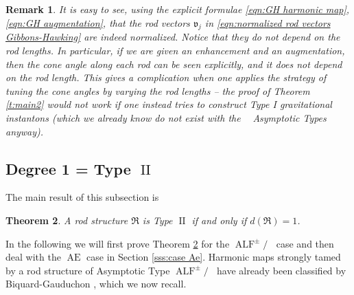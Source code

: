 \documentclass[a4paper,11pt]{amsart}
\newtheorem{theorem}{Theorem}[section]
\newtheorem{remark}[theorem]{Remark}
\theoremstyle{definition}
\numberwithin{equation}{section}
\newcommand{\mv} {\mathfrak v}
\newcommand{\mR} {\mathfrak R}
\DeclareMathOperator{\II}{II}
\DeclareMathOperator{\Ae}{AE}
\DeclareMathOperator{\ALF}{ALF}
\DeclareMathOperator{\AFa}{AF_\beta}
\begin{document}
\begin{remark}\label{rem:angle invariant in Type I}
It is easy to see, using the explicit formulae \eqref{eqn:GH harmonic map}, \eqref{eqn:GH augmentation}, that the  rod vectors $\mv_j$ in \eqref{eqn:normalized rod vectors Gibbons-Hawking} are indeed normalized. Notice that they do not depend on the rod lengths. In particular, if we are given an enhancement and an augmentation, then the cone angle along each rod can be seen explicitly, and it does not depend on the rod length. This gives a complication when one applies the strategy of tuning the cone angles by varying the rod lengths -- the proof of Theorem \ref{t:main2} would not work if one instead tries to construct Type I gravitational instantons (which we already know do not exist with the $\AFa$ Asymptotic Types anyway).
\end{remark}


\subsection{Degree 1 = Type \texorpdfstring{$\II$}{II}}
\label{sec:7.3}


The main result of this subsection is
\begin{theorem}\label{thm:degree equivalence Type II}
A rod structure $\mR$ is Type $\II$ if and only if $d(\mathfrak R)=1$.
\end{theorem}


In the following we will first prove Theorem \ref{thm:degree equivalence Type II} for the $\ALF^\pm/\AFa$ case and then deal with the $\Ae$ case in Section \ref{sss:case Ae}. Harmonic maps strongly tamed by a rod structure of  Asymptotic Type  $\ALF^\pm/\AFa$ have already been classified by Biquard-Gauduchon \cite{BG}, which we now recall. 
\end{document}
